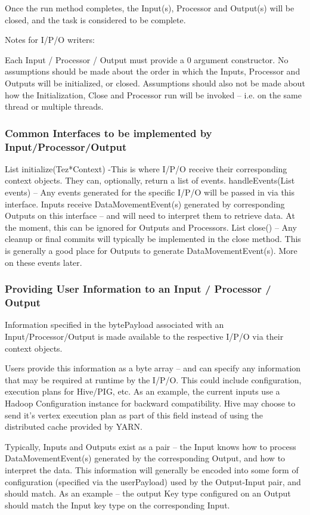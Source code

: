 \documentclass[twocolumn]{article}
\begin{document}
Once the run method completes, the Input(s), Processor and Output(s)
will be closed, and the task is considered to be complete.

Notes for I/P/O writers:

Each Input / Processor / Output must provide a 0 argument constructor.
No assumptions should be made about the order in which the Inputs,
Processor and Outputs will be initialized, or closed. Assumptions should
also not be made about how the Initialization, Close and Processor run
will be invoked -- i.e. on the same thread or multiple threads.

\subsubsection{Common Interfaces to be implemented by
Input/Processor/Output}

List initialize(Tez*Context) -This is where I/P/O receive their
corresponding context objects. They can, optionally, return a list of
events. handleEvents(List events) -- Any events generated for the
specific I/P/O will be passed in via this interface. Inputs receive
DataMovementEvent(s) generated by corresponding Outputs on this
interface -- and will need to interpret them to retrieve data. At the
moment, this can be ignored for Outputs and Processors. List close() --
Any cleanup or final commits will typically be implemented in the close
method. This is generally a good place for Outputs to generate
DataMovementEvent(s). More on these events later.

\subsubsection{Providing User Information to an Input / Processor /
Output}

Information specified in the bytePayload associated with an
Input/Processor/Output is made available to the respective I/P/O via
their context objects.

Users provide this information as a byte array -- and can specify any
information that may be required at runtime by the I/P/O. This could
include configuration, execution plans for Hive/PIG, etc. As an example,
the current inputs use a Hadoop Configuration instance for backward
compatibility. Hive may choose to send it's vertex execution plan as
part of this field instead of using the distributed cache provided by
YARN.

Typically, Inputs and Outputs exist as a pair -- the Input knows how to
process DataMovementEvent(s) generated by the corresponding Output, and
how to interpret the data. This information will generally be encoded
into some form of configuration (specified via the userPayload) used by
the Output-Input pair, and should match. As an example -- the output Key
type configured on an Output should match the Input key type on the
corresponding Input.
\end{document}
